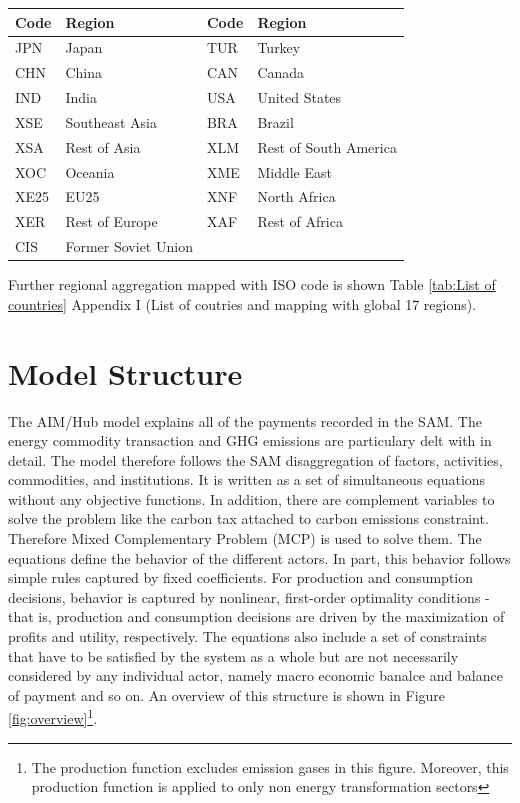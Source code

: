 \documentclass[10pt,a4paper,titlepage,dvipdfmx]{book}
\begin{document}
\begin{tabularx}{\textwidth}{|
p{}|
p{}|
p{}|
p{}|} 
\caption{\label{tab:Reg} List of regions}\\
\hline 
Code & Region & Code & Region \\\hline 
JPN & Japan & TUR & Turkey \\\hline 
CHN & China & CAN & Canada \\\hline 
IND & India & USA & United States \\\hline 
XSE & Southeast Asia & BRA & Brazil \\\hline 
XSA & Rest of Asia & XLM & Rest of South America \\\hline 
XOC & Oceania & XME & Middle East \\\hline 
XE25 & EU25 & XNF & North Africa \\\hline 
XER & Rest of Europe & XAF & Rest of Africa \\\hline 
CIS & Former Soviet Union &   &   \\\hline 
\end{tabularx}



Further regional aggregation mapped with ISO code is shown Table \ref{tab:List of countries} Appendix I (List of coutries and mapping with global 17 regions).

\chapter{\label{chp:ModelStr}Model Structure}

The AIM/Hub model explains all of the payments recorded in the SAM. The energy commodity transaction and GHG emissions are particulary delt with in detail. The model therefore follows the SAM disaggregation of factors, activities, commodities, and institutions. It is written as a set of simultaneous equations without any objective functions. In addition, there are complement variables to solve the problem like the carbon tax attached to carbon emissions constraint. Therefore Mixed Complementary Problem (MCP) is used to solve them. The equations define the behavior of the different actors. In part, this behavior follows simple rules captured by fixed coefficients. For production and consumption decisions, behavior is captured by nonlinear, first-order optimality conditions - that is, production and consumption decisions are driven by the maximization of profits and utility, respectively. The equations also include a set of constraints that have to be satisfied by the system as a whole but are not necessarily considered by any individual actor, namely macro economic banalce and balance of payment and so on. An overview of this structure is shown in Figure \ref{fig:overview}\footnote{The production function excludes emission gases in this figure. Moreover, this production function is applied to only non energy transformation sectors}.
\end{document}
